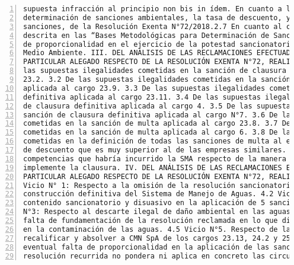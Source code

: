 \begin{Verbatim}[frame=lines, label=Elavoración propia -  Ejemplo de Contexto enviado por el Chatbot a OpenAI
				, fontsize=\scriptsize, numbers=left
				, baselinestretch=0.4
				, formatcom=\color{gray}]
supuesta infracción al principio non bis in ídem. En cuanto a la metodología para la
determinación de sanciones ambientales, la tasa de descuento, y la proporcionalidad de las
sanciones, de la Resolución Exenta N°72/2018.2.7 En cuanto al cálculo de la Tasa de Descuento
descrita en las “Bases Metodológicas para Determinación de Sanciones Ambientales”. El estándar
de proporcionalidad en el ejercicio de la potestad sancionatoria de la Superintendencia del
Medio Ambiente. III. DEL ANÁLISIS DE LAS RECLAMACIONES EFECTUADAS PARA CADA CARGO EN
PARTICULAR ALEGADO RESPECTO DE LA RESOLUCIÓN EXENTA N°72, REALIZADO EN CAUSA R-5-2018. 3.1 De
las supuestas ilegalidades cometidas en la sanción de clausura definitiva aplicada al cargo
23.2. 3.2 De las supuestas ilegalidades cometidas en la sanción de clausura definitiva
aplicada al cargo 23.9. 3.3 De las supuestas ilegalidades cometidas en la sanción de clausura
definitiva aplicada al cargo 23.11. 3.4 De las supuestas ilegalidades cometidas en la sanción
de clausura definitiva aplicada al cargo 4. 3.5 De las supuestas ilegalidades cometidas en la
sanción de clausura definitiva aplicada al cargo N°7. 3.6 De las supuestas ilegalidades
cometidas en la sanción de multa aplicada al cargo 23.8. 3.7 De las supuestas ilegalidades
cometidas en la sanción de multa aplicada al cargo 6. 3.8 De las supuestas ilegalidades
cometidas en la definición de todas las sanciones de multa al establecer un criterio de tasa
de descuento que es muy superior al de las empresas similares. 3.9 Del supuesto exceso en las
competencias que habría incurrido la SMA respecto de la manera en que pretende que se
implemente la clausura. IV. DEL ANÁLISIS DE LAS RECLAMACIONES EFECTUADAS PARA CADA CARGO EN
PARTICULAR ALEGADO RESPECTO DE LA RESOLUCIÓN EXENTA N°72, REALIZADO EN CAUSA R-6-2018. 4.1
Vicio N° 1: Respecto a la omisión de la resolución sancionatoria de ordenar a CMN SpA la
construcción definitiva del Sistema de Manejo de Aguas. 4.2 Vicio N°2: Sobre la falta de
contenido sancionatorio y disuasivo en la aplicación de 5 sanciones de clausura. 4.3 Vicio
N°3: Respecto al descarte ilegal de daño ambiental en las aguas. 4.4 Vicio N°4: De la supuesta
falta de fundamentación de la resolución reclamada en lo que dice relación con la causalidad
en la contaminación de las aguas. 4.5 Vicio N°5. Respecto de la motivación de la SMA para
recalificar y absolver a CMN SpA de los cargos 23.13, 24.2 y 25. 4.6 Vicio N°6: Sobre la
eventual falta de proporcionalidad en la aplicación de las sanciones. 4.7 Vicio N°7: La
resolución recurrida no pondera ni aplica en concreto las circunstancias que contempla el

\end{Verbatim}
